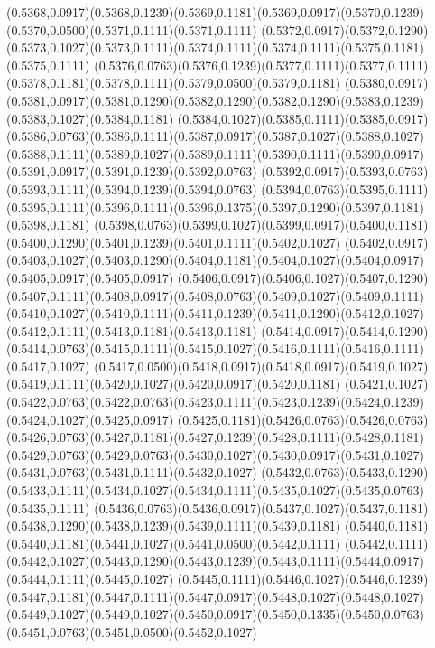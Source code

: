 (0.5368,0.0917)(0.5368,0.1239)(0.5369,0.1181)(0.5369,0.0917)(0.5370,0.1239)(0.5370,0.0500)(0.5371,0.1111)(0.5371,0.1111)
(0.5372,0.0917)(0.5372,0.1290)(0.5373,0.1027)(0.5373,0.1111)(0.5374,0.1111)(0.5374,0.1111)(0.5375,0.1181)(0.5375,0.1111)
(0.5376,0.0763)(0.5376,0.1239)(0.5377,0.1111)(0.5377,0.1111)(0.5378,0.1181)(0.5378,0.1111)(0.5379,0.0500)(0.5379,0.1181)
(0.5380,0.0917)(0.5381,0.0917)(0.5381,0.1290)(0.5382,0.1290)(0.5382,0.1290)(0.5383,0.1239)(0.5383,0.1027)(0.5384,0.1181)
(0.5384,0.1027)(0.5385,0.1111)(0.5385,0.0917)(0.5386,0.0763)(0.5386,0.1111)(0.5387,0.0917)(0.5387,0.1027)(0.5388,0.1027)
(0.5388,0.1111)(0.5389,0.1027)(0.5389,0.1111)(0.5390,0.1111)(0.5390,0.0917)(0.5391,0.0917)(0.5391,0.1239)(0.5392,0.0763)
(0.5392,0.0917)(0.5393,0.0763)(0.5393,0.1111)(0.5394,0.1239)(0.5394,0.0763)
\PST@Solid(0.5394,0.0763)(0.5395,0.1111)(0.5395,0.1111)(0.5396,0.1111)(0.5396,0.1375)(0.5397,0.1290)(0.5397,0.1181)(0.5398,0.1181)
(0.5398,0.0763)(0.5399,0.1027)(0.5399,0.0917)(0.5400,0.1181)(0.5400,0.1290)(0.5401,0.1239)(0.5401,0.1111)(0.5402,0.1027)
(0.5402,0.0917)(0.5403,0.1027)(0.5403,0.1290)(0.5404,0.1181)(0.5404,0.1027)(0.5404,0.0917)(0.5405,0.0917)(0.5405,0.0917)
(0.5406,0.0917)(0.5406,0.1027)(0.5407,0.1290)(0.5407,0.1111)(0.5408,0.0917)(0.5408,0.0763)(0.5409,0.1027)(0.5409,0.1111)
(0.5410,0.1027)(0.5410,0.1111)(0.5411,0.1239)(0.5411,0.1290)(0.5412,0.1027)(0.5412,0.1111)(0.5413,0.1181)(0.5413,0.1181)
(0.5414,0.0917)(0.5414,0.1290)(0.5414,0.0763)(0.5415,0.1111)(0.5415,0.1027)(0.5416,0.1111)(0.5416,0.1111)(0.5417,0.1027)
(0.5417,0.0500)(0.5418,0.0917)(0.5418,0.0917)(0.5419,0.1027)(0.5419,0.1111)(0.5420,0.1027)(0.5420,0.0917)(0.5420,0.1181)
(0.5421,0.1027)(0.5422,0.0763)(0.5422,0.0763)(0.5423,0.1111)(0.5423,0.1239)(0.5424,0.1239)(0.5424,0.1027)(0.5425,0.0917)
(0.5425,0.1181)(0.5426,0.0763)(0.5426,0.0763)(0.5426,0.0763)(0.5427,0.1181)(0.5427,0.1239)(0.5428,0.1111)(0.5428,0.1181)
(0.5429,0.0763)(0.5429,0.0763)(0.5430,0.1027)(0.5430,0.0917)(0.5431,0.1027)(0.5431,0.0763)(0.5431,0.1111)(0.5432,0.1027)
(0.5432,0.0763)(0.5433,0.1290)(0.5433,0.1111)(0.5434,0.1027)(0.5434,0.1111)(0.5435,0.1027)(0.5435,0.0763)(0.5435,0.1111)
(0.5436,0.0763)(0.5436,0.0917)(0.5437,0.1027)(0.5437,0.1181)(0.5438,0.1290)(0.5438,0.1239)(0.5439,0.1111)(0.5439,0.1181)
(0.5440,0.1181)(0.5440,0.1181)(0.5441,0.1027)(0.5441,0.0500)(0.5442,0.1111)
\PST@Solid(0.5442,0.1111)(0.5442,0.1027)(0.5443,0.1290)(0.5443,0.1239)(0.5443,0.1111)(0.5444,0.0917)(0.5444,0.1111)(0.5445,0.1027)
(0.5445,0.1111)(0.5446,0.1027)(0.5446,0.1239)(0.5447,0.1181)(0.5447,0.1111)(0.5447,0.0917)(0.5448,0.1027)(0.5448,0.1027)
(0.5449,0.1027)(0.5449,0.1027)(0.5450,0.0917)(0.5450,0.1335)(0.5450,0.0763)(0.5451,0.0763)(0.5451,0.0500)(0.5452,0.1027)
